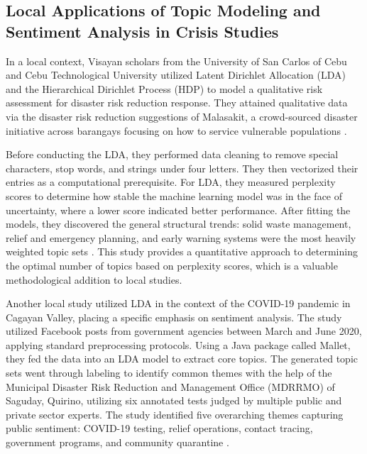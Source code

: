 \documentclass[12pt,a4paper]{report}
\begin{document}
\subsection{Local Applications of Topic Modeling and Sentiment Analysis in
Crisis Studies}

In a local context, Visayan scholars from the University of San Carlos of Cebu
and Cebu Technological University utilized Latent Dirichlet Allocation (LDA)
and the Hierarchical Dirichlet Process (HDP) to model a qualitative risk
assessment for disaster risk reduction response. They attained qualitative data
via the disaster risk reduction suggestions of Malasakit, a crowd-sourced
disaster initiative across barangays focusing on how to service vulnerable
populations \parencite{gorro2021}.

Before conducting the LDA, they performed data cleaning to remove special
characters, stop words, and strings under four letters. They then vectorized
their entries as a computational prerequisite. For LDA, they measured
perplexity scores to determine how stable the machine learning model was in the
face of uncertainty, where a lower score indicated better performance. After
fitting the models, they discovered the general structural trends: solid waste
management, relief and emergency planning, and early warning systems were the
most heavily weighted topic sets \parencite{gorro2021}. This study provides a
quantitative approach to determining the optimal number of topics based on
perplexity scores, which is a valuable methodological addition to local
studies.

Another local study utilized LDA in the context of the COVID-19 pandemic in
Cagayan Valley, placing a specific emphasis on sentiment analysis. The study
utilized Facebook posts from government agencies between March and June 2020,
applying standard preprocessing protocols. Using a Java package called Mallet,
they fed the data into an LDA model to extract core topics. The generated topic
sets went through labeling to identify common themes with the help of the
Municipal Disaster Risk Reduction and Management Office (MDRRMO) of Saguday,
Quirino, utilizing six annotated tests judged by multiple public and private
sector experts. The study identified five overarching themes capturing public
sentiment: COVID-19 testing, relief operations, contact tracing, government
programs, and community quarantine \parencite{pagudpud2020}.
\end{document}
